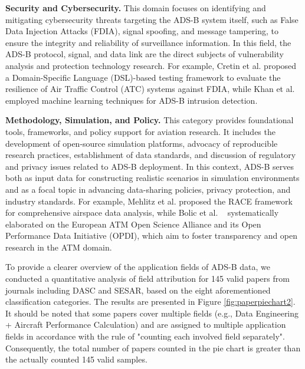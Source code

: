 \textbf{Security and Cybersecurity.}
This domain focuses on identifying and mitigating cybersecurity threats targeting the ADS-B system itself, such as False Data Injection Attacks (FDIA), signal spoofing, and message tampering, to ensure the integrity and reliability of surveillance information. In this field, the ADS-B protocol, signal, and data link are the direct subjects of vulnerability analysis and protection technology research. For example, Cretin et al.\cite{cretin2018increasing} proposed a Domain-Specific Language (DSL)-based testing framework to evaluate the resilience of Air Traffic Control (ATC) systems against FDIA, while Khan et al. \cite{khan2021intrusion} employed machine learning techniques for ADS-B intrusion detection.

\textbf{Methodology, Simulation, and Policy.}
This category provides foundational tools, frameworks, and policy support for aviation research. It includes the development of open-source simulation platforms, advocacy of reproducible research practices, establishment of data standards, and discussion of regulatory and privacy issues related to ADS-B deployment. In this context, ADS-B serves both as input data for constructing realistic scenarios in simulation environments and as a focal topic in advancing data-sharing policies, privacy protection, and industry standards. For example, Mehlitz et al. \cite{mehlitz2019analyzing} proposed the RACE framework for comprehensive airspace data analysis, while Bolic et al. ~\cite{bolic2024roadmap} systematically elaborated on the European ATM Open Science Alliance and its Open Performance Data Initiative (OPDI), which aim to foster transparency and open research in the ATM domain.

To provide a clearer overview of the application fields of ADS-B data, we conducted a quantitative analysis of field attribution for 145 valid papers from journals including DASC and SESAR, based on the eight aforementioned classification categories. The results are presented in Figure \ref{fig:paperpiechart2}. It should be noted that some papers cover multiple fields (e.g., Data Engineering + Aircraft Performance Calculation) and are assigned to multiple application fields in accordance with the rule of "counting each involved field separately". Consequently, the total number of papers counted in the pie chart is greater than the actually counted 145 valid samples.

